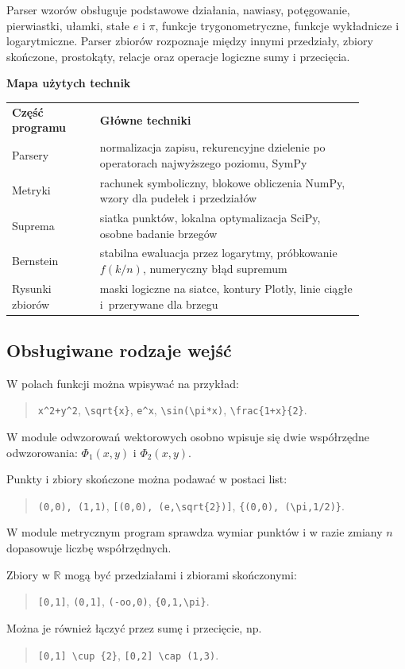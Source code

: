 \documentclass[12pt,a4paper]{article}
\newcommand{\plainnote}[2]{%
\par\medskip
\noindent\begin{minipage}{0.94\linewidth}
\textbf{#1}\par\smallskip
#2
\end{minipage}
\par\medskip
}
\newcommand{\methodbox}[2]{\plainnote{#1}{#2}}
\begin{document}
Parser wzorów obsługuje podstawowe działania, nawiasy, potęgowanie, pierwiastki, ułamki, stałe $e$ i $\pi$, funkcje trygonometryczne, funkcje wykładnicze i logarytmiczne. Parser zbiorów rozpoznaje między innymi przedziały, zbiory skończone, prostokąty, relacje oraz operacje logiczne sumy i przecięcia.

\methodbox{Mapa użytych technik}{
\small
\begin{tabular}{p{0.22\linewidth}p{0.66\linewidth}}
\textbf{Część programu} & \textbf{Główne techniki} \\
Parsery & normalizacja zapisu, rekurencyjne dzielenie po operatorach najwyższego poziomu, SymPy \\
Metryki & rachunek symboliczny, blokowe obliczenia NumPy, wzory dla pudełek i przedziałów \\
Suprema & siatka punktów, lokalna optymalizacja SciPy, osobne badanie brzegów \\
Bernstein & stabilna ewaluacja przez logarytmy, próbkowanie $f(k/n)$, numeryczny błąd supremum \\
Rysunki zbiorów & maski logiczne na siatce, kontury Plotly, linie ciągłe i~przerywane dla brzegu \\
\end{tabular}
}

\subsection{Obsługiwane rodzaje wejść}

W polach funkcji można wpisywać na przykład:
\begin{quote}
\small
\verb|x^2+y^2|,\quad
\verb|\sqrt{x}|,\quad
\verb|e^x|,\quad
\verb|\sin(\pi*x)|,\quad
\verb|\frac{1+x}{2}|.
\end{quote}
W module odwzorowań wektorowych osobno wpisuje się dwie współrzędne odwzorowania: $\Phi_1(x,y)$ i $\Phi_2(x,y)$.

Punkty i zbiory skończone można podawać w postaci list:
\begin{quote}
\small
\verb|(0,0), (1,1)|,\quad
\verb|[(0,0), (e,\sqrt{2})]|,\quad
\verb|{(0,0), (\pi,1/2)}|.
\end{quote}
W module metrycznym program sprawdza wymiar punktów i w razie zmiany $n$ dopasowuje liczbę współrzędnych.

Zbiory w $\mathbb{R}$ mogą być przedziałami i zbiorami skończonymi:
\begin{quote}
\small
\verb|[0,1]|,\quad
\verb|(0,1]|,\quad
\verb|(-oo,0)|,\quad
\verb|{0,1,\pi}|.
\end{quote}
Można je również łączyć przez sumę i przecięcie, np.
\begin{quote}
\small
\verb|[0,1] \cup {2}|,\quad
\verb|[0,2] \cap (1,3)|.
\end{quote}
\end{document}
